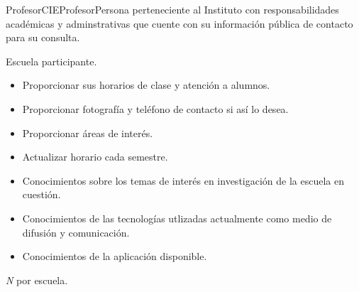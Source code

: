 \begin{actor}{Profesor}{CIEProfesor}{Persona perteneciente al Instituto con responsabilidades académicas y adminstrativas que cuente con su información pública de contacto para su consulta.}
	
	\item[Área:] Escuela participante.
	\item[Responsabilidades:] \hspace{1pt}
	
	\begin{itemize}
		
		\item Proporcionar sus horarios de clase y atención a alumnos.
		\item Proporcionar fotografía y teléfono de contacto si así lo desea.
		\item Proporcionar áreas de interés.
		\item Actualizar horario cada semestre.
		
		
	\end{itemize}
	
	\item[Perfil:] \hspace{1pt}
	
	\begin{itemize}
		
		\item Conocimientos sobre los temas de interés en investigación de la escuela en cuestión.
		\item Conocimientos de las tecnologías utlizadas actualmente como medio de difusión y comunicación.
		\item Conocimientos de la aplicación disponible.
		
	\end{itemize}
	
	\item[Cantidad:] \textit{N} por escuela.
	
\end{actor}
%
%
%
%
